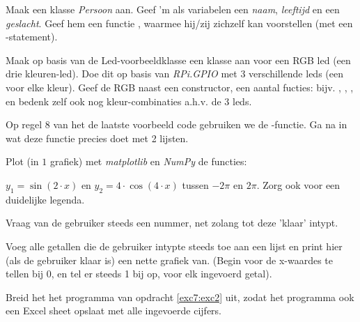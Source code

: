 \begin{exercise}
Maak een klasse \textit{Persoon} aan. Geef 'm als variabelen een \textit{naam}, \textit{leeftijd} en een \textit{geslacht}. Geef hem een functie , waarmee hij/zij zichzelf kan voorstellen (met een -statement). 
\end{exercise}

\begin{exercise}
Maak op basis van de Led-voorbeeldklasse een klasse aan voor een RGB led (een drie kleuren-led). Doe dit op basis van \textit{RPi.GPIO} met $3$ verschillende leds (een voor elke kleur). Geef de RGB naast een constructor, een aantal fucties: bijv. , , ,  en bedenk zelf ook nog kleur-combinaties a.h.v. de $3$ leds.
\end{exercise}

\begin{exercise}
Op regel $8$ van het de laatste voorbeeld code gebruiken we de -functie. Ga na in wat deze functie precies doet met 2 lijsten. 
\end{exercise}

\begin{exercise}
Plot (in $1$ grafiek) met \textit{matplotlib} en \textit{NumPy} de functies: 

$y_{1}=\sin(2\cdot x)$ en $y_{2}=4\cdot\cos(4\cdot x)$ tussen $-2\pi$ en $2\pi$. Zorg ook voor een duidelijke legenda.
\end{exercise}

\begin{exercise}
\label{exc7:exc2}
Vraag van de gebruiker steeds een nummer, net zolang tot deze 'klaar' intypt. 

Voeg alle getallen die de gebruiker intypte steeds toe aan een lijst en print hier (als de gebruiker klaar is) een nette grafiek van. (Begin voor de x-waardes te tellen bij $0$, en tel er steeds 1 bij op, voor elk ingevoerd getal).
\end{exercise}

\begin{exercise}
\label{exc7:exc3}
Breid het het programma van opdracht \ref{exc7:exc2} uit, zodat het programma ook een Excel sheet opslaat met alle ingevoerde cijfers.
\end{exercise}

